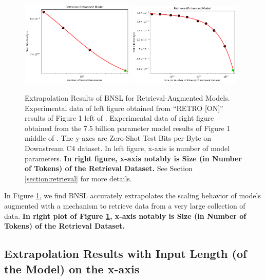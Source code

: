 \documentclass{article} %
\begin{document}
\begin{figure}[htbp]
    \centering
\includegraphics[width=0.48\textwidth]{figures/retrieval/retrieval__num_of_parameters.png}
\includegraphics[width=0.48\textwidth]{figures/retrieval/retrieval__retrieval_dataset_size.png}

\vspace{-3.5mm}
    \caption{
Extrapolation Results of BNSL for Retrieval-Augmented Models. Experimental data of left figure obtained from ``RETRO [ON]'' results of Figure 1 left of \cite{borgeaud2022improving}. Experimental data of right figure obtained from the 7.5 billion parameter model results of Figure 1 middle of \cite{borgeaud2022improving}. The y-axes are Zero-Shot Test Bits-per-Byte on Downstream C4 \citep{2019t5} dataset. In left figure, x-axis is number of model parameters. \textbf{In right figure, x-axis notably is Size (in Number of Tokens) of the Retrieval Dataset.} See Section \ref{section:retrieval} for more details.
    }
    \label{fig:retrieval}
\end{figure}

In Figure \ref{fig:retrieval}, we find BNSL accurately extrapolates the scaling behavior of models augmented with a mechanism to retrieve data from a very large collection of data. \textbf{In right plot of Figure \ref{fig:retrieval}, x-axis notably is Size (in Number of Tokens) of the Retrieval Dataset.}


\subsection{Extrapolation Results with Input Length (of the Model) on the x-axis}
\label{section:length}
\end{document}
